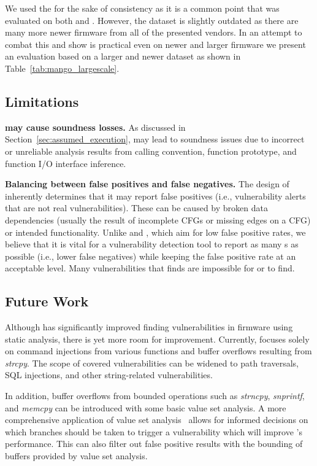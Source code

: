 We used the \karonteDataset for the sake of consistency as it is a common point that was evaluated on both \satc and \karonte.
However, the dataset is slightly outdated as there are many more newer firmware from all of the presented vendors.
In an attempt to combat this and show \mango is practical even on newer and larger firmware we present an evaluation based on a larger and newer dataset as shown in Table~\ref{tab:mango_largescale}.

\subsection{Limitations}

\noindent
\textbf{\assumed may cause soundness losses.}
As discussed in Section~\ref{sec:assumed_execution}, \assumed may lead to soundness issues due to incorrect or unreliable analysis results from calling convention, function prototype, and function I/O interface inference.

\smallskip
\noindent
\textbf{Balancing between false positives and false negatives.}
The design of \mango inherently determines that it may report false positives (i.e., vulnerability alerts that are not real vulnerabilities).
These can be caused by broken data dependencies (usually the result of incomplete CFGs or missing edges on a CFG) or intended functionality.
Unlike \karonte and \satc, which aim for low false positive rates, we believe that it is vital for a vulnerability detection tool to report as many \trupoc{}s as possible (i.e., lower false negatives) while keeping the false positive rate at an acceptable level.
Many vulnerabilities that \mango finds are impossible for \karonte or \satc to find.

\subsection{Future Work}
Although \mango has significantly improved finding vulnerabilities in firmware using static analysis, there is yet more room for improvement.
Currently, \mango focuses solely on command injections from various functions and buffer overflows resulting from \textit{strcpy}.
The scope of covered vulnerabilities can be widened to path traversals, SQL injections, and other string-related vulnerabilities.

In addition, buffer overflows from bounded operations such as \textit{strncpy}, \textit{snprintf}, and \textit{memcpy} can be introduced with some basic value set analysis.
A more comprehensive application of value set analysis~\cite{balakrishnan2005codesurfer} allows for informed decisions on which branches should be taken to trigger a vulnerability which will improve \assumed's performance.
This can also filter out false positive results with the bounding of buffers provided by value set analysis.

